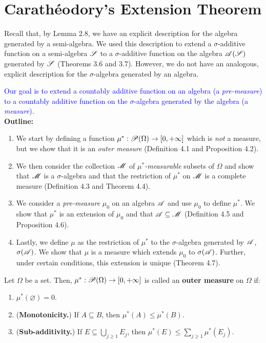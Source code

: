 \section{Carathéodory's Extension Theorem}

Recall that, by Lemma 2.8, we have an explicit description for the algebra generated by a semi-algebra. We used this description to extend a $\sigma$-additive function on a semi-algebra $\mathscr{S}$ to a $\sigma$-additive function on the algebra $\mathscr{A}(\mathscr{S})$ generated by $\mathscr{S}$ (Theorems 3.6 and 3.7). However, we do not have an analogous, explicit description for the $\sigma$-algebra generated by an algebra. 

\textcolor{blue}{Our goal is to extend a countably additive function on an algebra (a \emph{pre-measure}) to a countably additive function on the $\sigma$-algebra generated by the algebra (a \emph{measure}).} \\

\textbf{Outline:} 

\begin{enumerate}
    \item We start by defining a function $\mu^* : \mathscr{P}(\Omega) \to [0, +\infty]$ which is \emph{not} a measure, but we show that it is an \emph{outer measure} (Definition 4.1 and Proposition 4.2).
    \item We then consider the collection $\mathscr{M}$ of \emph{$\mu^*$-measurable} subsets of $\Omega$ and show that $\mathscr{M}$ is a $\sigma$-algebra and that the restriction of $\mu^*$ on $\mathscr{M}$ is a complete measure (Definition 4.3 and Theorem 4.4).
    \item We consider a \emph{pre-measure} $\mu_0$ on an algebra $\mathscr{A}$ and use $\mu_0$ to define $\mu^*$. We show that $\mu^*$ is an extension of $\mu_0$ and that $\mathscr{A} \subseteq \mathscr{M}$ (Definition 4.5 and Proposition 4.6).
    \item Lastly, we define $\mu$ as the restriction of $\mu^*$ to the $\sigma$-algebra generated by $\mathscr{A}$, $\sigma(\mathscr{A})$. We show that $\mu$ is a measure which extends $\mu_0$ to $\sigma(\mathscr{A})$. Further, under certain conditions, this extension is unique (Theorem 4.7).
\end{enumerate}

\begin{definition}
    Let $\Omega$ be a set. Then, $\mu^*: \mathscr{P}(\Omega) \to [0, +\infty]$ is called an \textbf{outer measure} on $\Omega$ if:
    \begin{enumerate}
        \item $\mu^*(\varnothing) = 0$.
        \item (\textbf{Monotonicity.}) If $A \subseteq B$, then $\mu^*(A) \leq \mu^*(B)$.
        \item  (\textbf{Sub-additivity.}) If $E \subseteq \bigcup_{j \geq 1} E_j$, then $\mu^*(E) \leq \sum_{j \geq 1} \mu^{*}(E_j).$
    \end{enumerate}    
\end{definition}



